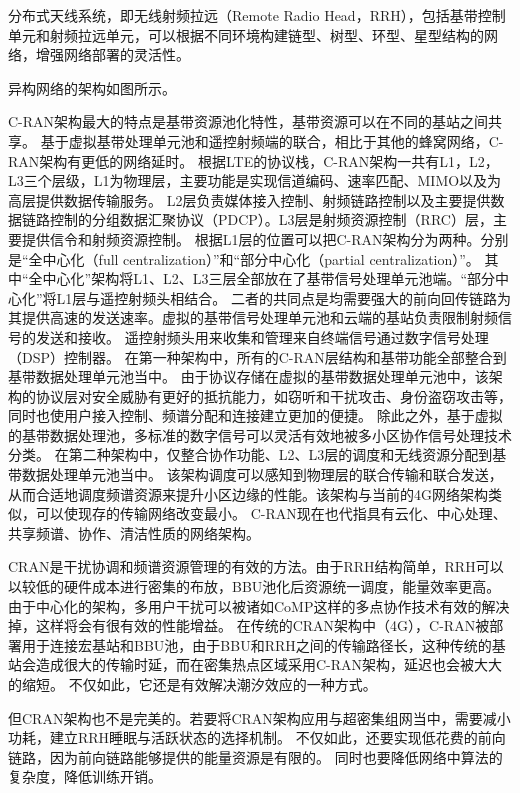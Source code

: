 分布式天线系统，即无线射频拉远（Remote Radio Head，RRH），包括基带控制单元和射频拉远单元，可以根据不同环境构建链型、树型、环型、星型结构的网络，增强网络部署的灵活性。

异构网络的架构如图所示。

C-RAN架构最大的特点是基带资源池化特性，基带资源可以在不同的基站之间共享。
基于虚拟基带处理单元池和遥控射频端的联合，相比于其他的蜂窝网络，C-RAN架构有更低的网络延时。
根据LTE的协议栈，C-RAN架构一共有L1，L2，L3三个层级，L1为物理层，主要功能是实现信道编码、速率匹配、MIMO以及为高层提供数据传输服务。
L2层负责媒体接入控制、射频链路控制以及主要提供数据链路控制的分组数据汇聚协议（PDCP）。L3层是射频资源控制（RRC）层，主要提供信令和射频资源控制。
根据L1层的位置可以把C-RAN架构分为两种。分别是“全中心化（full centralization）”和“部分中心化（partial centralization）”。
其中“全中心化”架构将L1、L2、L3三层全部放在了基带信号处理单元池端。“部分中心化”将L1层与遥控射频头相结合。
二者的共同点是均需要强大的前向回传链路为其提供高速的发送速率。虚拟的基带信号处理单元池和云端的基站负责限制射频信号的发送和接收。
遥控射频头用来收集和管理来自终端信号通过数字信号处理（DSP）控制器。
在第一种架构中，所有的C-RAN层结构和基带功能全部整合到基带数据处理单元池当中。
由于协议存储在虚拟的基带数据处理单元池中，该架构的协议层对安全威胁有更好的抵抗能力，如窃听和干扰攻击、身份盗窃攻击等，同时也使用户接入控制、频谱分配和连接建立更加的便捷。
除此之外，基于虚拟的基带数据处理池，多标准的数字信号可以灵活有效地被多小区协作信号处理技术分类。
在第二种架构中，仅整合协作功能、L2、L3层的调度和无线资源分配到基带数据处理单元池当中。
该架构调度可以感知到物理层的联合传输和联合发送，从而合适地调度频谱资源来提升小区边缘的性能。该架构与当前的4G网络架构类似，可以使现存的传输网络改变最小。
C-RAN现在也代指具有云化、中心处理、共享频谱、协作、清洁性质的网络架构。

CRAN是干扰协调和频谱资源管理的有效的方法。由于RRH结构简单，RRH可以以较低的硬件成本进行密集的布放，BBU池化后资源统一调度，能量效率更高。
由于中心化的架构，多用户干扰可以被诸如CoMP这样的多点协作技术有效的解决掉，这样将会有很有效的性能增益。
在传统的CRAN架构中（4G），C-RAN被部署用于连接宏基站和BBU池，由于BBU和RRH之间的传输路径长，这种传统的基站会造成很大的传输时延，而在密集热点区域采用C-RAN架构，延迟也会被大大的缩短。
不仅如此，它还是有效解决潮汐效应的一种方式。

但CRAN架构也不是完美的。若要将CRAN架构应用与超密集组网当中，需要减小功耗，建立RRH睡眠与活跃状态的选择机制。
不仅如此，还要实现低花费的前向链路，因为前向链路能够提供的能量资源是有限的。
同时也要降低网络中算法的复杂度，降低训练开销。

